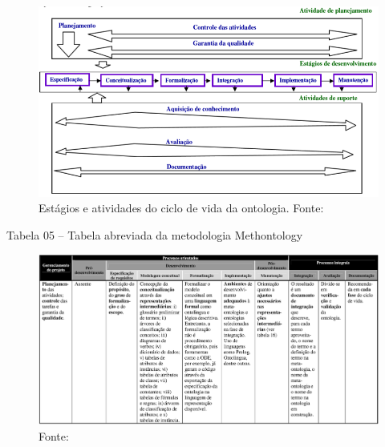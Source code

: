 \begin{figure}[h] 
\centering %
\includegraphics[scale=0.5]{Figuras/8.png} %
\caption[Estágios e atividades do ciclo de vida da ontologia]{Estágios e atividades do ciclo de vida da ontologia. Fonte: \cite{DanielaLucas2008}}
\end{figure}

\pagebreak
Tabela 05 – Tabela abreviada da metodologia Methontology

\begin{figure}[h] 
\centering %
\includegraphics[scale=0.4]{Figuras/9.png} %
\caption{Fonte: \cite{DanielaLucas2008}}
\end{figure}

